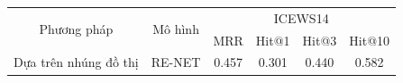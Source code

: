 \begin{table}[H]
\begin{adjustbox}{width=\textwidth}
\begin{tabular}{|cc|cccc|}
\hline
\multicolumn{1}{|c|}{\multirow{2}{*}{Phương pháp}}     & \multirow{2}{*}{Mô hình} & \multicolumn{4}{c|}{ICEWS14}                                                                        \\ \cline{3-6} 
\multicolumn{1}{|c|}{}                                 &                          & \multicolumn{1}{c|}{MRR} & \multicolumn{1}{c|}{Hit@1} & \multicolumn{1}{c|}{Hit@3} & Hit@10         \\ \hline
\multicolumn{1}{|c|}{\multirow{4}{*}{Dựa trên nhúng đồ thị}} & RE-NET                   & 0.457                    & 0.301                      & 0.440                      & 0.582          \\ \cline{2-2}

\end{tabular}
\end{adjustbox}
\end{table}
